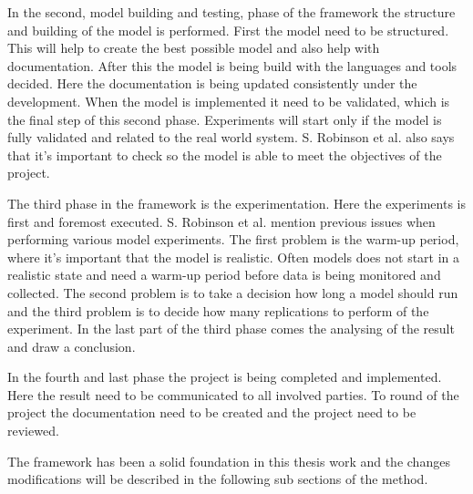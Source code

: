 In the second, model building and testing, phase of the framework the structure and building of the model is performed.
First the model need to be structured. 
This will help to create the best possible model and also help with documentation.
After this the model is being build with the languages and tools decided.
Here the documentation is being updated consistently under the development.
When the model is implemented it need to be validated, which is the final step of this second phase.
Experiments will start only if the model is fully validated and related to the real world system.
S. Robinson et al. also says that it's important to check so the model is able to meet the objectives of the project.

\bigskip

The third phase in the framework is the experimentation.
Here the experiments is first and foremost executed.
S. Robinson et al. mention previous issues when performing various model experiments.
The first problem is the warm-up period, where it's important that the model is realistic.
Often models does not start in a realistic state and need a warm-up period before data is being monitored and collected.
The second problem is to take a decision how long a model should run and the third problem is to decide how many replications to perform of the experiment.
In the last part of the third phase comes the analysing of the result and draw a conclusion.

\bigskip

In the fourth and last phase the project is being completed and implemented.
Here the result need to be communicated to all involved parties.
To round of the project the documentation need to be created and the project need to be reviewed.

\bigskip

The framework has been a solid foundation in this thesis work and the changes modifications will be described in the following sub sections of the method.


